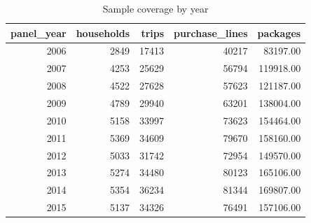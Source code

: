 \begin{table}
\caption{Sample coverage by year}
\begin{tabular}{rrrrr}
\toprule
panel\_year & households & trips & purchase\_lines & packages \\
\midrule
2006 & 2849 & 17413 & 40217 & 83197.00 \\
2007 & 4253 & 25629 & 56794 & 119918.00 \\
2008 & 4522 & 27628 & 57623 & 121187.00 \\
2009 & 4789 & 29940 & 63201 & 138004.00 \\
2010 & 5158 & 33997 & 73623 & 154464.00 \\
2011 & 5369 & 34609 & 79670 & 158160.00 \\
2012 & 5033 & 31742 & 72954 & 149570.00 \\
2013 & 5274 & 34480 & 80123 & 165106.00 \\
2014 & 5354 & 36234 & 81344 & 169807.00 \\
2015 & 5137 & 34326 & 76491 & 157106.00 \\
\bottomrule
\end{tabular}
\end{table}
